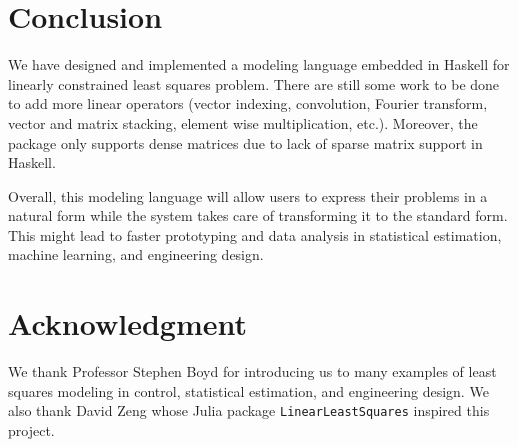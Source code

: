\documentclass[12pt]{article}
\begin{document}
\section{Conclusion}

We have designed and implemented a modeling language embedded in Haskell for
linearly constrained least squares problem.
There are still some work to be done to add more linear operators (vector
indexing, convolution, Fourier transform, vector and matrix stacking, element
wise multiplication, etc.).
Moreover, the package only supports dense matrices due to lack of sparse matrix
support in Haskell.

Overall, this modeling language will allow users to express their problems in a
natural form while the system takes care of transforming it to the standard
form.
This might lead to faster prototyping and data analysis in statistical
estimation, machine learning, and engineering design.

\section*{Acknowledgment}

We thank Professor Stephen Boyd for introducing us to many examples of least
squares modeling in control, statistical estimation, and engineering design.
We also thank David Zeng whose Julia package \verb|LinearLeastSquares| inspired
this project.
\end{document}
